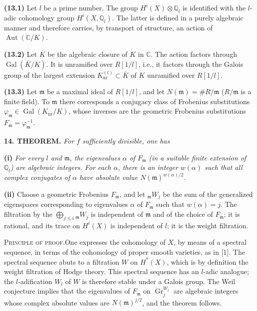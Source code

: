\documentclass[8pt]{extarticle}
\newcommand{\DSourceFolio}{--}
\newcommand{\DAuthorityPage}{--}
\newcommand{\SourcePage}[2]{%
  \renewcommand{\DSourceFolio}{#1}%
  \renewcommand{\DAuthorityPage}{#2}%
  \thispagestyle{dpage}%
}
\newcommand{\EndSourcePage}{\clearpage}
\newcommand{\ReaderFont}{\fontsize{7.35}{8.15}\selectfont}
\newcommand{\NumPara}[1]{\par\noindent\textbf{#1}\enspace}
\newcommand{\TheoremPara}[1]{\par\noindent\textbf{#1}\enspace\itshape}
\newcommand{\EndTheorem}{\par\normalfont}
\newcommand{\ProofHeadEN}{\par\noindent\textsc{Principle of proof.}\enspace}
\newcommand{\Q}{\mathbb{Q}}
\newcommand{\C}{\mathbb{C}}
\newcommand{\Gr}{\operatorname{Gr}}
\newcommand{\Aut}{\operatorname{Aut}}
\newcommand{\Gal}{\operatorname{Gal}}
\begin{document}
\NumPara{(13.1)} Let \(l\) be a prime number. The group \(H^i(X)\otimes\Q_l\) is identified with the \(l\)-adic cohomology group \(H^i(X,\Q_l)\). The latter is defined in a purely algebraic manner and therefore carries, by transport of structure, an action of \(\Aut(\C/K)\).

\NumPara{(13.2)} Let \(\overline K\) be the algebraic closure of \(K\) in \(\C\). The action factors through \(\Gal(\overline K/K)\). It is unramified over \(R[1/l]\), i.e., it factors through the Galois group of the largest extension \(K_{\mathrm{nr}}^{(l)}\subset\overline K\) of \(K\) unramified over \(R[1/l]\).

\NumPara{(13.3)} Let \(\mathfrak m\) be a maximal ideal of \(R[1/l]\), and let \(N(\mathfrak m)=\#R/\mathfrak m\) (\(R/\mathfrak m\) is a finite field). To \(\mathfrak m\) there corresponds a conjugacy class of Frobenius substitutions \(\varphi_{\mathfrak m}\in\Gal(K_{\mathrm{nr}}/K)\), whose inverses are the geometric Frobenius substitutions \(F_{\mathfrak m}=\varphi_{\mathfrak m}^{-1}\).

\TheoremPara{14. THEOREM.} For \(f\) sufficiently divisible, one has\EndTheorem
\EndSourcePage

\SourcePage{84}{6}
\ReaderFont
\TheoremPara{(i)} For every \(l\) and \(\mathfrak m\), the eigenvalues \(\alpha\) of \(F_{\mathfrak m}\) (in a suitable finite extension of \(\Q_l\)) are algebraic integers. For each \(\alpha\), there is an integer \(w(\alpha)\) such that all complex conjugates of \(\alpha\) have absolute value \(N(\mathfrak m)^{w(\alpha)/2}\).

\NumPara{(ii)} Choose a geometric Frobenius \(F_{\mathfrak m}\), and let \({}_{\mathfrak m}W_j\) be the sum of the generalized eigenspaces corresponding to eigenvalues \(\alpha\) of \(F_{\mathfrak m}\) such that \(w(\alpha)=j\). The filtration by the \(\bigoplus_{j\le i}{}_{\mathfrak m}W_j\) is independent of \(\mathfrak m\) and of the choice of \(F_{\mathfrak m}\); it is rational, and its trace on \(H^i(X)\) is independent of \(l\); it is the weight filtration.\EndTheorem

\ProofHeadEN One expresses the cohomology of \(X\), by means of a spectral sequence, in terms of the cohomology of proper smooth varieties, as in [1]. The spectral sequence abuts to a filtration \(W\) on \(H^*(X)\), which is by definition the weight filtration of Hodge theory. This spectral sequence has an \(l\)-adic analogue; the \(l\)-adification \(W_l\) of \(W\) is therefore stable under a Galois group. The Weil conjecture implies that the eigenvalues of \(F_{\mathfrak m}\) on \(\Gr_j^{W_l}\) are algebraic integers whose complex absolute values are \(N(\mathfrak m)^{j/2}\), and the theorem follows.
\end{document}

